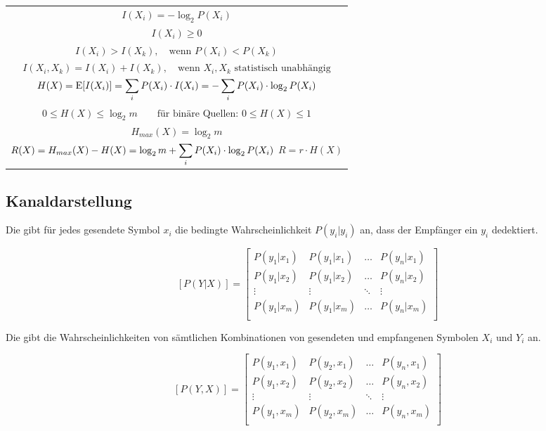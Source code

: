 \documentclass[a4paper]{article}
\begin{document}
\begin{twocolumn}
\begin{center}
\begin{tabular}{c}
  $I(X_i) = -\log_2{P(X_i)}$ \\
  $I(X_i) \geq 0$ \\
  $I(X_i) > I(X_k), \quad \text{wenn } P(X_i) < P(X_k)$ \\
  $I(X_i, X_k) = I(X_i) + I(X_k), \quad \text{wenn } X_i, X_k \text{ statistisch unabhängig}$ \\
  $\displaystyle H(X) = \operatorname{E}[I(X_i)] = \sum_i P(X_i) \cdot I(X_i) = - \sum_i P(X_i) \cdot \log_2{ P(X_i)}$ \\
  $0 \leq H(X) \leq \log_2{m} \qquad \text{für binäre Quellen: } 0 \leq H(X) \leq 1$ \\
  $H_{max}(X) = \log_2{m}$ \\
  $\displaystyle R(X) = H_{max}(X) - H(X) = \log_2{m} + \sum_i P(X_i) \cdot \log_2{P(X_i)}$
  $R = r \cdot H(X)$
\end{tabular}
\end{center}

\subsection{Kanaldarstellung}

Die  gibt für jedes gesendete Symbol $x_i$ die bedingte Wahrscheinlichkeit 
$P(y_i|y_i)$ an, dass der Empfänger ein $y_i$ dedektiert. 

$$[P(Y|X)] = \left[ \begin{array}{cccc} 
  P(y_1|x_1) & P(y_1|x_1) & \ldots & P(y_n|x_1) \\
  P(y_1|x_2) & P(y_1|x_2) & \ldots & P(y_n|x_2) \\
  \vdots & \vdots & \ddots & \vdots \\
  P(y_1|x_m) & P(y_1|x_m) & \ldots & P(y_n|x_m) \\
\end{array} \right]$$

Die  gibt die Wahrscheinlichkeiten von sämtlichen Kombinationen von gesendeten 
und empfangenen Symbolen $X_i$ und $Y_i$ an.

$$[P(Y,X)] = \left[ \begin{array}{cccc} 
  P(y_1,x_1) & P(y_2,x_1) & \ldots & P(y_n,x_1) \\
  P(y_1,x_2) & P(y_2,x_2) & \ldots & P(y_n,x_2) \\
  \vdots & \vdots & \ddots & \vdots \\
  P(y_1,x_m) & P(y_2,x_m) & \ldots & P(y_n,x_m) \\
\end{array} \right]$$


\end{twocolumn}
\end{document}

